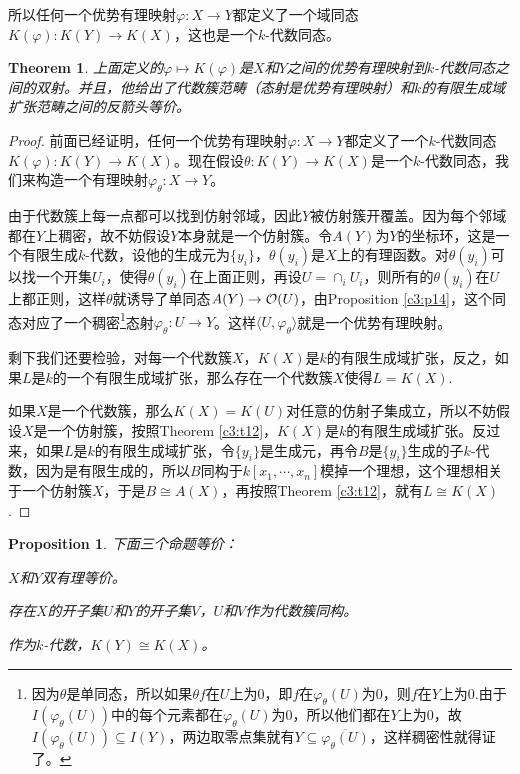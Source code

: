 \documentclass[9pt]{extbook}
\theoremstyle{plain}%
\newtheorem{pro}[defi]{Proposition}%
\newtheorem{theo}[defi]{Theorem}%
\begin{document}
所以任何一个优势有理映射$\varphi:X\to Y$都定义了一个域同态$K(\varphi):K(Y)\to K(X)$，这也是一个$k$-代数同态。
\begin{theo}
	上面定义的$\varphi\mapsto K(\varphi)$是$X$和$Y$之间的优势有理映射到$k$-代数同态之间的双射。并且，他给出了代数簇范畴（态射是优势有理映射）和$k$的有限生成域扩张范畴之间的反箭头等价。
\end{theo}
\begin{proof}
	前面已经证明，任何一个优势有理映射$\varphi:X\to Y$都定义了一个$k$-代数同态$K(\varphi):K(Y)\to K(X)$。现在假设$\theta:K(Y)\to K(X)$是一个$k$-代数同态，我们来构造一个有理映射$\varphi_\theta:X\to Y$。

	由于代数簇上每一点都可以找到仿射邻域，因此$Y$被仿射簇开覆盖。因为每个邻域都在$Y$上稠密，故不妨假设$Y$本身就是一个仿射簇。令$A(Y)$为$Y$的坐标环，这是一个有限生成$k$-代数，设他的生成元为$\{y_i\}$，$\theta(y_i)$是$X$上的有理函数。对$\theta(y_i)$可以找一个开集$U_i$，使得$\theta(y_i)$在上面正则，再设$U=\cap_i U_i$，则所有的$\theta(y_i)$在$U$上都正则，这样$\theta$就诱导了单同态$A(Y)\to \mathcal{O}(U)$，由Proposition \ref{c3:p14}，这个同态对应了一个稠密\footnote{因为$\theta$是单同态，所以如果$\theta f$在$U$上为$0$，即$f$在$\varphi_\theta(U)$为$0$，则$f$在$Y$上为$0$.由于$I(\varphi_\theta(U))$中的每个元素都在$\varphi_\theta(U)$为$0$，所以他们都在$Y$上为$0$，故$I(\varphi_\theta(U))\subseteq I(Y)$，两边取零点集就有$Y \subseteq \overline{\varphi_\theta(U)}$，这样稠密性就得证了。}态射$\varphi_\theta:U\to Y$。这样$\langle U,\varphi_\theta\rangle$就是一个优势有理映射。

	剩下我们还要检验，对每一个代数簇$X$，$K(X)$是$k$的有限生成域扩张，反之，如果$L$是$k$的一个有限生成域扩张，那么存在一个代数簇$X$使得$L=K(X)$.

	如果$X$是一个代数簇，那么$K(X)=K(U)$对任意的仿射子集成立，所以不妨假设$X$是一个仿射簇，按照Theorem \ref{c3:t12}，$K(X)$是$k$的有限生成域扩张。反过来，如果$L$是$k$的有限生成域扩张，令$\{y_i\}$是生成元，再令$B$是$\{y_i\}$生成的子$k$-代数，因为是有限生成的，所以$B$同构于$k[x_1,\cdots,x_n]$模掉一个理想，这个理想相关于一个仿射簇$X$，于是$B\cong A(X)$，再按照Theorem \ref{c3:t12}，就有$L\cong K(X)$.
\end{proof}
\begin{pro}
	下面三个命题等价：

	 $X$和$Y$双有理等价。

	 存在$X$的开子集$U$和$Y$的开子集$V$，$U$和$V$作为代数簇同构。

	 作为$k$-代数，$K(Y)\cong K(X)$。
\end{pro}
\end{document}
